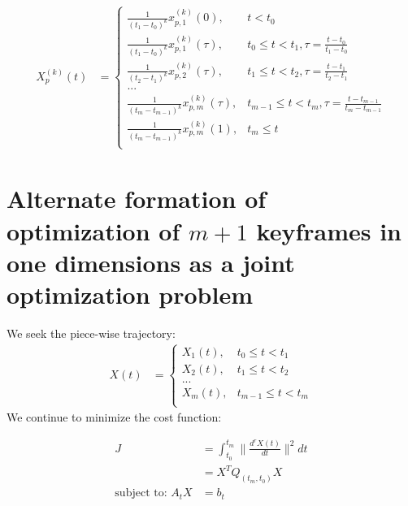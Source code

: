 \documentclass[11pt]{article}
\begin{document}
\begin{align*}
X_p^{(k)}(t) &= 
\begin{cases}
    \frac{1}{(t_1-t_0)^k} x^{(k)}_{p,1}(0), & t < t_0 \\
    \frac{1}{(t_1-t_0)^k} x^{(k)}_{p,1} (\tau) , & t_0 \le t < t_1, \tau = \frac{t-t_0}{t_1-t_0}  \\
    \frac{1}{(t_2-t_1)^k} x^{(k)}_{p,2} (\tau) , & t_1 \le t < t_2, \tau = \frac{t-t_1}{t_2-t_1}  \\
    ... \\
    \frac{1}{(t_m-t_{m-1})^k} x^{(k)}_{p,m} (\tau) , & t_{m-1} \le t < t_m, \tau = \frac{t-t_{m-1}}{t_m-t_{m-1}} \\
    \frac{1}{(t_m-t_{m-1})^k} x^{(k)}_{p,m} (1), & t_m \le t \\
\end{cases}
\end{align*} 








\newpage
\section{Alternate formation of optimization of $m+1$ keyframes in one dimensions as a joint optimization problem}

\mbox{} \newline
We seek the piece-wise trajectory: 
\begin{align*}
X(t) &= 
\begin{cases}
    X_1 (t), & t_0 \le t < t_1 \\
    X_2 (t), & t_1 \le t < t_2 \\
    ... \\
    X_m (t), & t_{m-1} \le t < t_m \\
\end{cases}
\end{align*} 
We continue to minimize the cost function:

\begin{align*}
J &= \int_{t_0}^{t_m} \|  \frac{d^{r} X(t) }{dt} \|^2 dt \\
&= X^T Q_{(t_m, t_0)} X \\
\text{subject to: } A_t X &=b_t
\end{align*}
\end{document}
